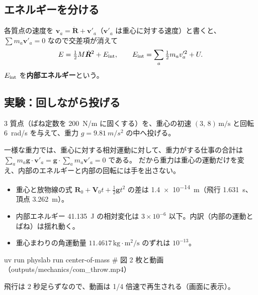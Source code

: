 \subsection*{エネルギーを分ける}

各質点の速度を $\bm v_a=\dot{\bm R}+\bm v'_a$（$\bm v'_a$ は重心に対する速度）と書くと、
$\sum m_a\bm v'_a=0$ なので交差項が消えて
\begin{equation}
  E=\tfrac12M\dot{\bm R}^2+E_{\rm int},\qquad
  E_{\rm int}=\sum_a\tfrac12m_av'^2_a+U .
  \label{eq:energy-split}
\end{equation}
$E_{\rm int}$ を\textbf{内部エネルギー}という。

\subsection*{実験：回しながら投げる}

3 質点（ばね定数を \qty{200}{N/m} に固くする）を、重心の初速 $(3,\,8)\,\mathrm{m/s}$ と回転
\qty{6}{rad/s} を与えて、重力 $g=\qty{9.81}{m/s^2}$ の中へ投げる。


一様な重力では、重心に対する相対運動に対して、重力がする仕事の合計は
$\sum_am_a\bm g\cdot\bm v'_a=\bm g\cdot\sum_am_a\bm v'_a=0$ である。
だから重力は重心の運動だけを変え、内部のエネルギーと内部の回転には手を出さない。


\begin{itemize}
  \item 重心と放物線の式 $\bm R_0+\bm V_0t+\tfrac12\bm gt^2$ の差は \qty{1.4e-14}{m}（飛行 \qty{1.631}{s}、頂点 \qty{3.262}{m}）。
  \item 内部エネルギー \qty{41.135}{J} の相対変化は $3\times10^{-6}$ 以下。内訳（内部の運動とばね）は揺れ動く。
  \item 重心まわりの角運動量 $11.4617\,\mathrm{kg\cdot m^2/s}$ のずれは $10^{-13}$。
\end{itemize}

\begin{simbox}
\begin{terminal}
uv run physlab run center-of-mass      # 図 2 枚と動画（outputs/mechanics/com_throw.mp4）
\end{terminal}
飛行は 2 秒足らずなので、動画は 1/4 倍速で再生される（画面に表示）。
\end{simbox}

